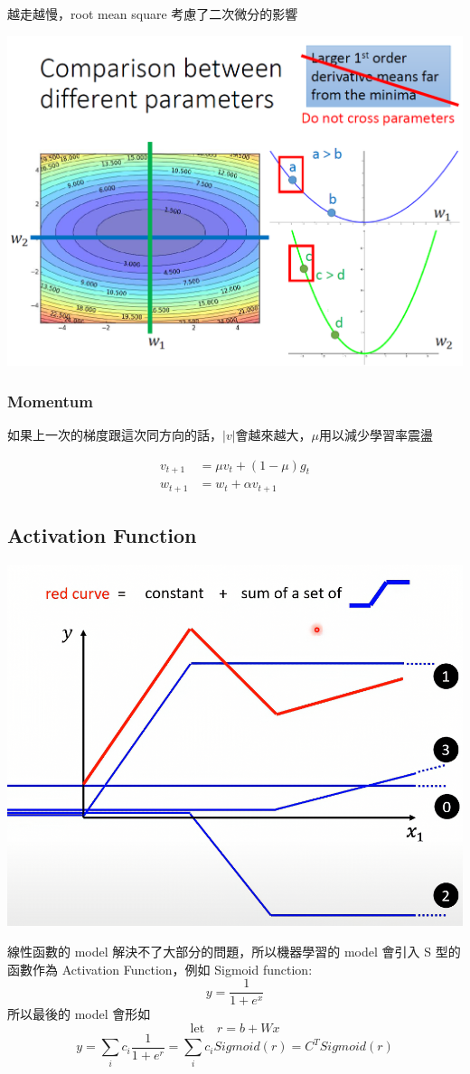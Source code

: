 越走越慢，root mean square 考慮了二次微分的影響


\includegraphics[width=.8\textwidth]{paste_src/2025-03-20-06-21-55.png}
\subsubsection*{Momentum}
如果上一次的梯度跟這次同方向的話，$|v|$會越來越大，$\mu$用以減少學習率震盪

\begin{align}
  v_{t+1} &= \mu v_{t} + (1-\mu) g_t \\
  w_{t+1} &= w_t + \alpha v_{t+1}
\end{align}





\subsection{Activation Function}
\includegraphics[width=.6\textwidth]{paste_src/2025-03-20-03-47-32.png}

線性函數的 model 解決不了大部分的問題，所以機器學習的 model 會引入 S 型的函數作為 Activation Function，例如 Sigmoid function:
$$
y= \frac{1}{1+e^x}
$$
所以最後的 model 會形如 
$$
\mbox{let}\quad r = b + Wx 
$$
$$
y = \sum_i c_i \frac{1}{1+e^{r}} = \sum_i c_i Sigmoid(r) =C^TSigmoid(r)
$$













